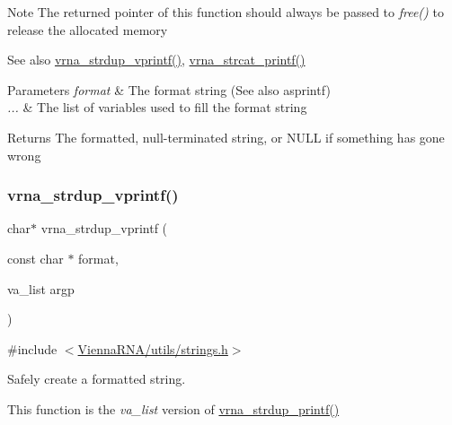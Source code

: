 \begin{DoxyNote}{Note}
The returned pointer of this function should always be passed to {\itshape free()} to release the allocated memory
\end{DoxyNote}
\begin{DoxySeeAlso}{See also}
\mbox{\hyperlink{group__string__utils_ga459fdee190ed81bb7773cbaf671748a9}{vrna\+\_\+strdup\+\_\+vprintf()}}, \mbox{\hyperlink{group__string__utils_gac0771ec71316023067f2aae61a5aa0fb}{vrna\+\_\+strcat\+\_\+printf()}}
\end{DoxySeeAlso}

\begin{DoxyParams}{Parameters}
{\em format} & The format string (See also asprintf) \\
\hline
{\em ...} & The list of variables used to fill the format string \\
\hline
\end{DoxyParams}
\begin{DoxyReturn}{Returns}
The formatted, null-\/terminated string, or N\+U\+LL if something has gone wrong 
\end{DoxyReturn}
\mbox{\label{group__string__utils_ga459fdee190ed81bb7773cbaf671748a9}} 
\subsubsection{\texorpdfstring{vrna\_strdup\_vprintf()}{vrna\_strdup\_vprintf()}}
{\footnotesize\ttfamily char$\ast$ vrna\+\_\+strdup\+\_\+vprintf (\begin{DoxyParamCaption}\item[{const char $\ast$}]{format,  }\item[{va\+\_\+list}]{argp }\end{DoxyParamCaption})}



{\ttfamily \#include $<$\mbox{\hyperlink{strings_8h}{Vienna\+R\+N\+A/utils/strings.\+h}}$>$}



Safely create a formatted string. 

This function is the {\itshape va\+\_\+list} version of \mbox{\hyperlink{group__string__utils_ga33cc0190a326ec368277caa777b8bf18}{vrna\+\_\+strdup\+\_\+printf()}}

